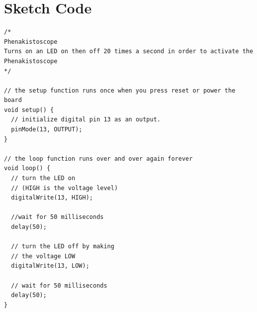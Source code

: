 \newpage
\section*{Sketch Code}
\label{sketch:exp5}
\begin{lstlisting}
/*
Phenakistoscope
Turns on an LED on then off 20 times a second in order to activate the Phenakistoscope
*/

// the setup function runs once when you press reset or power the board
void setup() {
  // initialize digital pin 13 as an output.
  pinMode(13, OUTPUT);
}

// the loop function runs over and over again forever
void loop() {
  // turn the LED on 
  // (HIGH is the voltage level)
  digitalWrite(13, HIGH);
	
  //wait for 50 milliseconds
  delay(50);
	
  // turn the LED off by making 
  // the voltage LOW
  digitalWrite(13, LOW);    
	            
  // wait for 50 milliseconds              
  delay(50);
}
\end{lstlisting}